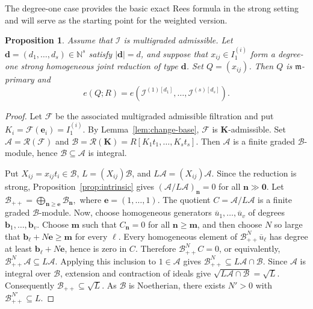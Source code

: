 \documentclass[reqno,12pt]{amsart}
\theoremstyle{plain}
\newtheorem{prop}{Proposition}[section]
\theoremstyle{definition}
\theoremstyle{remark}
\newcommand{\N}{\mathbb N}
\numberwithin{equation}{section}
\begin{document}
The degree-one case provides the basic exact Rees formula in the strong
setting and will serve as the starting point for the weighted version. 
\begin{prop}
\label{prop:degree-one-rees}
Assume that $\boldsymbol{\mathcal I}$ is multigraded admissible. Let
$\mathbf d=(d_1,\ldots,d_s)\in\N^s$ satisfy $|\mathbf d|=d$, and suppose
that $x_{ij}\in I_1^{(i)}$ form a degree-one strong homogeneous joint
reduction of type $\mathbf d$. Set $Q=(x_{ij})$. Then $Q$ is
$\mathfrak m$-primary and
\[
e(Q;R)
=
e\!\left(\mathcal I^{(1)[d_1]},\ldots,
\mathcal I^{(s)[d_s]}\right).
\]
\end{prop}

\begin{proof}
Let $\mathcal F$ be the associated multigraded admissible filtration and
put $K_i=\mathcal F(\mathbf e_i)=I_1^{(i)}$. By
Lemma~\ref{lem:change-base}, $\mathcal F$ is $\mathbf K$-admissible.
Set
$\mathcal A=\mathcal R(\mathcal F)$ and
$\mathcal B=\mathcal R(\mathbf K)=R[K_1t_1,\ldots,K_st_s]$.
Then $\mathcal A$ is a finite graded $\mathcal B$-module, hence
$\mathcal B\subseteq\mathcal A$ is integral.

Put $X_{ij}=x_{ij}t_i\in\mathcal B$,
$L=(X_{ij})\mathcal B$, and $L\mathcal A=(X_{ij})\mathcal A$.
Since the reduction is strong,
Proposition~\ref{prop:intrinsic} gives
$(\mathcal A/L\mathcal A)_{\mathbf n}=0$ for all
$\mathbf n\gg\mathbf0$. Let $\mathcal B_{++}
=
\bigoplus_{\mathbf n\geq\mathbf e}\mathcal B_{\mathbf n},$ where $\mathbf e=(1,\ldots,1).$
The quotient $C=\mathcal A/L\mathcal A$ is a finite graded
$\mathcal B$-module. Now, choose homogeneous generators
$\overline u_1,\ldots,\overline u_v$ of degrees
$\mathbf b_1,\ldots,\mathbf b_v$. Choose
$\mathbf m$ such that $C_{\mathbf n}=0$ for all
$\mathbf n\geq\mathbf m$, and then choose $N$ so large that
$\mathbf b_\ell+N\mathbf e\geq\mathbf m$ for every $\ell$. Every
homogeneous element of $\mathcal B_{++}^N\overline u_\ell$ has degree
at least $\mathbf b_\ell+N\mathbf e$, hence is zero in $C$. Therefore $\mathcal B_{++}^{N}C=0$, or equivalently,
$\mathcal B_{++}^{N}\mathcal A\subseteq L\mathcal A.$
Applying this inclusion to $1\in\mathcal A$ gives
$\mathcal B_{++}^{N}\subseteq L\mathcal A\cap\mathcal B$. Since
$\mathcal A$ is integral over $\mathcal B$, extension and contraction of
ideals give $\sqrt{L\mathcal A\cap\mathcal B}=\sqrt L.$
Consequently $\mathcal B_{++}\subseteq\sqrt L$. As $\mathcal B$ is
Noetherian, there exists $N'>0$ with
$\mathcal B_{++}^{N'}\subseteq L$.


\end{proof}
\end{document}

